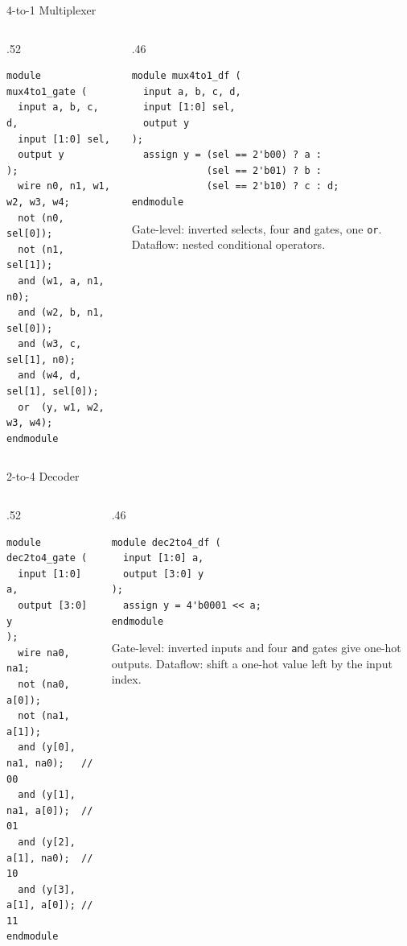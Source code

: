 \documentclass[9pt,aspectratio=169,xcolor=table]{beamer}
\begin{document}
\begin{frame}[fragile]{4-to-1 Multiplexer}
  \begin{columns}[t]
  \begin{column}{.52\textwidth}
\begin{lstlisting}
module mux4to1_gate (
  input a, b, c, d,
  input [1:0] sel,
  output y
);
  wire n0, n1, w1, w2, w3, w4;
  not (n0, sel[0]);
  not (n1, sel[1]);
  and (w1, a, n1, n0);
  and (w2, b, n1, sel[0]);
  and (w3, c, sel[1], n0);
  and (w4, d, sel[1], sel[0]);
  or  (y, w1, w2, w3, w4);
endmodule
\end{lstlisting}
  \end{column}
  \begin{column}{.46\textwidth}
\begin{lstlisting}
module mux4to1_df (
  input a, b, c, d,
  input [1:0] sel,
  output y
);
  assign y = (sel == 2'b00) ? a :
             (sel == 2'b01) ? b :
             (sel == 2'b10) ? c : d;
endmodule
\end{lstlisting}
    \small Gate-level: inverted selects, four \texttt{and} gates, one \texttt{or}. Dataflow: nested conditional operators.
  \end{column}
  \end{columns}
\end{frame}

\begin{frame}[fragile]{2-to-4 Decoder}
  \begin{columns}[t]
  \begin{column}{.52\textwidth}
\begin{lstlisting}
module dec2to4_gate (
  input [1:0] a,
  output [3:0] y
);
  wire na0, na1;
  not (na0, a[0]);
  not (na1, a[1]);
  and (y[0], na1, na0);   // 00
  and (y[1], na1, a[0]);  // 01
  and (y[2], a[1], na0);  // 10
  and (y[3], a[1], a[0]); // 11
endmodule
\end{lstlisting}
  \end{column}
  \begin{column}{.46\textwidth}
\begin{lstlisting}
module dec2to4_df (
  input [1:0] a,
  output [3:0] y
);
  assign y = 4'b0001 << a;
endmodule
\end{lstlisting}
    \small Gate-level: inverted inputs and four \texttt{and} gates give one-hot outputs. Dataflow: shift a one-hot value left by the input index.
  \end{column}
  \end{columns}
\end{frame}
\end{document}
